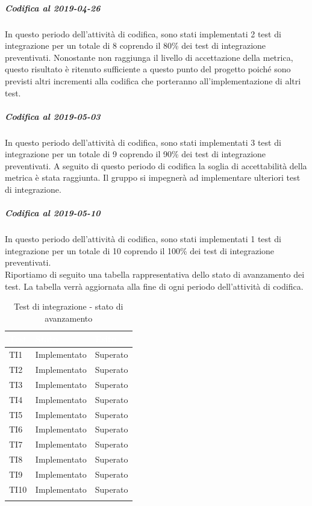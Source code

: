 \subparagraph{Codifica al 2019-04-26}
In questo periodo dell'attività di codifica, sono stati implementati 2 test di integrazione per un totale di 8 coprendo il 80\% dei test di integrazione preventivati.
Nonostante non raggiunga il livello di accettazione della
metrica, questo risultato è ritenuto sufficiente a questo punto del progetto poiché sono previsti altri incrementi alla codifica che porteranno all'implementazione di altri test. 

\subparagraph{Codifica al 2019-05-03}
In questo periodo dell'attività di codifica, sono stati implementati 3 test di integrazione per un totale di 9 coprendo il 90\% dei test di integrazione preventivati.
A seguito di questo periodo di codifica la soglia di accettabilità della metrica è stata raggiunta.
Il gruppo si impegnerà ad implementare ulteriori test di integrazione.


\subparagraph{Codifica al 2019-05-10}
In questo periodo dell'attività di codifica, sono stati implementati 1 test di integrazione per un totale di 10 coprendo il 100\% dei test di integrazione preventivati.\\
Riportiamo di seguito una tabella rappresentativa dello stato di avanzamento dei test. La tabella verrà aggiornata alla fine di ogni periodo dell'attività di codifica.

	\begin{longtable}{|>{\centering\arraybackslash}m{1.6cm}|>{\centering\arraybackslash}m{6.41cm}|>{\centering\arraybackslash}m{3.1cm}|}		
	\rowcolor{LightBlue}
	\textbf{\textcolor{white}{Test}}
	& \textbf{\textcolor{white}{Stato}}
	& \textbf{\textcolor{white}{Esito}}
	\\
	\hline
	TI1
	& Implementato & Superato
	\\ \hline
	\rowcolor{LightGray}
	TI2
	& Implementato & Superato
	\\ \hline
	TI3
	& Implementato & Superato
	\\ \hline
	\rowcolor{LightGray}
	TI4
	& Implementato & Superato
	\\ \hline
	TI5
	& Implementato & Superato
	\\ \hline
	\rowcolor{LightGray}
	TI6
	& Implementato & Superato
	\\ \hline	
	TI7
	& Implementato & Superato
	\\ \hline	
	\rowcolor{LightGray}
	TI8
	& Implementato & Superato
	\\ \hline	
	TI9
	& Implementato & Superato
	\\ \hline	
	\rowcolor{LightGray}
	TI10
	& Implementato & Superato
	\\ \hline	
	\caption{Test di integrazione - stato di avanzamento}
\end{longtable}

